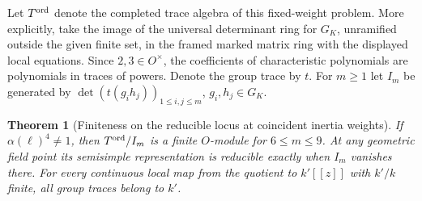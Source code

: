 \documentclass[a4paper,11pt]{article}
\newtheorem{theorem}[proposition]{Theorem}
\theoremstyle{definition}
\theoremstyle{remark}
\numberwithin{equation}{section}
\begin{document}
Let \(T^{\rm ord}\) denote the completed trace algebra of this
fixed-weight problem. More explicitly, take the image of the
universal determinant ring for \(G_K\), unramified outside the
given finite set, in the framed marked matrix ring with the
displayed local equations. Since \(2,3\in O^\times\), the
coefficients of characteristic polynomials are polynomials
in traces of powers. Denote the group trace by \(t\). For
\(m\ge1\) let \(I_m\) be generated by
\(\det(t(g_i h_j))_{1\le i,j\le m}\), \(g_i,h_j\in G_K\).

\begin{theorem}[Finiteness on the reducible locus at coincident inertia weights]\leavevmode
\label{thm:reduciblecollision435}
If \(\alpha(\ell)^4\ne1\), then \(T^{\rm ord}/I_m\) is a
finite \(O\)-module for \(6\le m\le9\). At any geometric
field point its semisimple representation is reducible
exactly when \(I_m\) vanishes there. For every continuous local
map from the quotient to \(k'[[z]]\) with \(k'/k\) finite,
all group traces belong to \(k'\).
\end{theorem}
\end{document}

